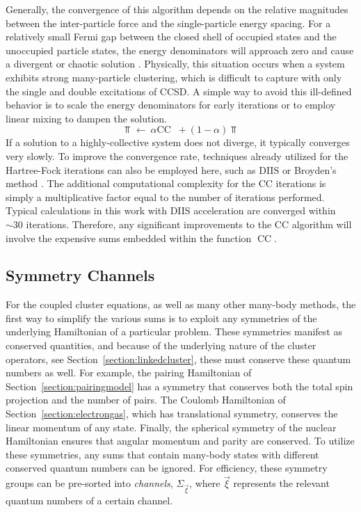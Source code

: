\documentclass[thesis.tex]{subfiles}
\begin{document}
Generally, the convergence of this algorithm depends on the relative magnitudes between the inter-particle force and the single-particle energy spacing.  For a relatively small Fermi gap between the closed shell of occupied states and the unoccupied particle states, the energy denominators will approach zero and cause a divergent or chaotic solution \cite{SZAKACS2008}.  Physically, this situation occurs when a system exhibits strong many-particle clustering, which is difficult to capture with only the single and double excitations of CCSD.  A simple way to avoid this ill-defined behavior is to scale the energy denominators for early iterations or to employ linear mixing to dampen the solution.
\begin{equation} \label{eq:cc_damping}
  \Top^{\mathop{(n+1)}} \leftarrow\ \alpha\text{CC}\mathop{(\Top^{\mathop{(n)}})} + \left(1 - \alpha\right)\Top^{\mathop{(n)}}
\end{equation}
If a solution to a highly-collective system does not diverge, it typically converges very slowly.  To improve the convergence rate, techniques already utilized for the Hartree-Fock iterations can also be employed here, such as DIIS \cite{PULAY1980393,PULAY1982556} or Broyden's method \cite{BROYDEN1965557}.  The additional computational complexity for the CC iterations is simply a multiplicative factor equal to the number of iterations performed.  Typical calculations in this work with DIIS acceleration are converged within $\sim 30$ iterations.  Therefore, any significant improvements to the CC algorithm will involve the expensive sums embedded within the function $\text{CC}\mathop{(\Top^{\mathop{(n)}})}$.


\subsection{Symmetry Channels} \label{section:symmetry_channels}

For the coupled cluster equations, as well as many other many-body methods, the first way to simplify the various sums is to exploit any symmetries of the underlying Hamiltonian of a particular problem.  These symmetries manifest as conserved quantities, and because of the underlying nature of the cluster operators, see Section\ \ref{section:linkedcluster}, these must conserve these quantum numbers as well.  For example, the pairing Hamiltonian of Section\ \ref{section:pairingmodel} has a symmetry that conserves both the total spin projection and the number of pairs.  The Coulomb Hamiltonian of Section\ \ref{section:electrongas}, which has translational symmetry, conserves the linear momentum of any state.  Finally, the spherical symmetry of the nuclear Hamiltonian ensures that angular momentum and parity are conserved.  To utilize these symmetries, any sums that contain many-body states with different conserved quantum numbers can be ignored.  For efficiency, these symmetry groups can be pre-sorted into \textit{channels}, $\Sigma_{\vec{\xi}}$, where $\vec{\xi}$ represents the relevant quantum numbers of a certain channel.
\end{document}
